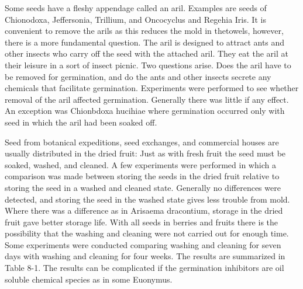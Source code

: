 Some seeds have a fleshy appendage called an aril. Examples are seeds of
Chionodoxa, Jeffersonia, Trillium, and Oncocyclus and Regehia Iris. It is convenient to
remove the arils as this reduces the mold in thetowels, however, there is a more
fundamental question. The aril is designed to attract ants and other insects who carry
off the seed with the attached aril. They eat the aril at their leisure in a sort of insect
picnic. Two questions arise. Does the aril have to be removed for germination, and do
the ants and other insects secrete any chemicals that facilitate germination.
Experiments were performed to see whether removal of the aril affected germination.
Generally there was little if any effect. An exception was Chionbdoxa hucihiae where
germination occurred only with seed in which the aril had been soaked off.

Seed from botanical expeditions, seed exchanges, and commercial houses are
usually distributed in the dried fruit: Just as with fresh fruit the seed must be soaked,
washed, and cleaned. A few experiments were performed in which a comparison was
made between storing the seeds in the dried fruit relative to storing the seed in a
washed and cleaned state. Generally no differences were detected, and storing the
seed in the washed state gives less trouble from mold. Where there was a difference
as in Arisaema dracontium, storage in the dried fruit gave better storage life.
With all seeds in berries and fruits there is the possibility that the washing and
cleaning were not carried out for enough time. Some experiments were conducted
comparing washing and cleaning for seven days with washing and cleaning for four
weeks. The results are summarized in Table 8-1. The results can be complicated if
the germination inhibitors are oil soluble chemical species as in some Euonymus.

